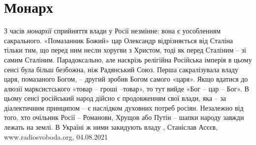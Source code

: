  
 
 
 
 
\chapter{Монарх}

З часів \emph{монархії} сприйняття влади у Росії незмінне: вона є уособленням
сакрального. «Помазанник Божий» цар Олександр відрізняється від Сталіна тільки
тим, що перед ним несли хоругви з Христом, тоді як перед Сталіним – зі самим
Сталіним. Парадоксально, але наскрізь релігійна Російська імперія в цьому сенсі
була більш безбожна, ніж Радянський Союз. Перша сакралізувала владу царя,
помазаного Богом, – другий зробив Богом самого «царя».  Якщо вдатися до алюзії
марксистського «товар – гроші –товар», то тут вийде «Бог – цар – Бог». В цьому
сенсі російський народ дійсно є продовженням свої влади, яка – за діалектичним
принципом – є наслідком духовних потреб росіян. Незалежно від того, хто
очільник Росії – Романови, Хрущов або Путін – шапки народу завжди лежать на
землі.  В Україні ж ними закидують владу
, 
Станіслав Асєєв, www.radiosvoboda.org, 04.08.2021
